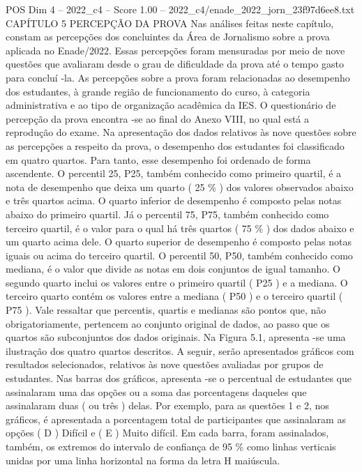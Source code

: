 \begin{textsample}{POS Dim 4 – 2022\_c4 – Score 1.00 – 2022\_c4/enade\_2022\_jorn\_23f97d6ee8.txt}  \label{ex:f4_pos_148}
CAPÍTULO 5 PERCEPÇÃO DA PROVA Nas análises feitas neste capítulo, constam as percepções dos concluintes da Área de Jornalismo sobre a prova aplicada no Enade/2022.
Essas percepções foram mensuradas por meio de nove questões que avaliaram desde o grau de dificuldade da prova até o tempo gasto para concluí -la.
As percepções sobre a prova foram relacionadas ao desempenho dos estudantes, à grande região de funcionamento do curso, à categoria administrativa e ao tipo de organização acadêmica da IES.
O questionário de percepção da prova encontra -se ao final do Anexo VIII, no qual está a reprodução do exame.
Na apresentação dos dados relativos às nove questões sobre as percepções a respeito da prova, o desempenho dos estudantes foi classificado em quatro quartos.
Para tanto, esse desempenho foi ordenado de forma ascendente.
O percentil 25, P25, também conhecido como primeiro quartil, é a nota de desempenho que deixa um quarto ( 25 \% ) dos valores observados abaixo e três quartos acima.
O quarto inferior de desempenho é composto pelas notas abaixo do primeiro quartil.
Já o percentil 75, P75, também conhecido como terceiro quartil, é o valor para o qual há três quartos ( 75 \% ) dos dados abaixo e um quarto acima dele.
O quarto superior de desempenho é composto pelas notas iguais ou acima do terceiro quartil.
O percentil 50, P50, também conhecido como mediana, é o valor que divide as notas em dois conjuntos de igual tamanho.
O segundo quarto inclui os valores entre o primeiro quartil ( P25 ) e a mediana.
O terceiro quarto contém os valores entre a mediana ( P50 ) e o terceiro quartil ( P75 ).
Vale ressaltar que percentis, quartis e medianas são pontos que, não obrigatoriamente, pertencem ao conjunto original de dados, ao passo que os quartos são subconjuntos dos dados originais.
Na Figura 5.1, apresenta -se uma ilustração dos quatro quartos descritos.
A seguir, serão apresentados gráficos com resultados selecionados, relativos às nove questões avaliadas por grupos de estudantes.
Nas barras dos gráficos, apresenta -se o percentual de estudantes que assinalaram uma das opções ou a soma das porcentagens daqueles que assinalaram duas ( ou três ) delas.
Por exemplo, para as questões 1 e 2, nos gráficos, é apresentada a porcentagem total de participantes que assinalaram as opções ( D ) Difícil e ( E ) Muito difícil.
Em cada barra, foram assinalados, também, os extremos do intervalo de confiança de 95 \% como linhas verticais unidas por uma linha horizontal na forma da letra H maiúscula.

\end{textsample}
